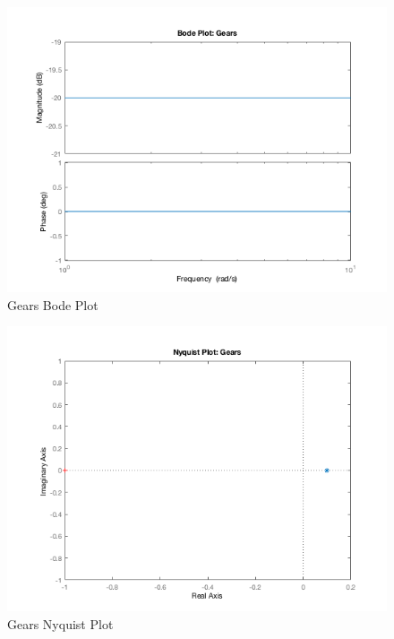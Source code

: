 \documentclass[12pt]{article}
\begin{document}
\begin{figure}[H]
\begin{center}
	\includegraphics[width=\textwidth]{./img/GearsBode.png}
	\caption{\label{fig:gearsbode}Gears Bode Plot}
\end{center}
\end{figure}

\begin{figure}[H]
\begin{center}
	\includegraphics[width=\textwidth]{./img/GearsNyquist.png}
	\caption{\label{fig:gearsnyquist}Gears Nyquist Plot}
\end{center}
\end{figure}
\end{document}

